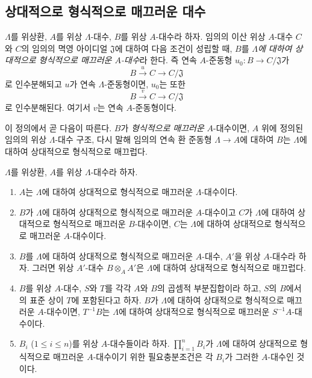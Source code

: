 \subsection{상대적으로 형식적으로 매끄러운 대수}
\label{subsection:0.19.9-ko}

\begin{definition}[19.9.1]
\label{0.19.9.1-ko}
$\Lambda$를 위상환, $A$를 위상 $\Lambda$-대수, $B$를 위상
$A$-대수라 하자. 임의의 이산 위상 $A$-대수 $C$와 $C$의 임의의
멱영 아이디얼 $\mathfrak J$에 대하여 다음 조건이 성립할 때, $B$를
\emph{$\Lambda$에 대하여 상대적으로 형식적으로 매끄러운 $A$-대수}라
한다. 즉 연속 $A$-준동형 $u_0:B\to C/\mathfrak J$가
\[
  B\xrightarrow{u}C\longrightarrow C/\mathfrak J
\]
로 인수분해되고 $u$가 연속 $\Lambda$-준동형이면, $u_0$는 또한
\[
  B\xrightarrow{v}C\longrightarrow C/\mathfrak J
\]
로 인수분해된다. 여기서 $v$는 연속 $A$-준동형이다.
\end{definition}

이 정의에서 곧 다음이 따른다. $B$가 \emph{형식적으로 매끄러운}
$A$-대수이면, $A$ 위에 정의된 임의의 위상 $\Lambda$-대수 구조,
다시 말해 임의의 연속 환 준동형 $\Lambda\to A$에 대하여 $B$는
$\Lambda$에 대하여 상대적으로 형식적으로 매끄럽다.

\begin{proposition}[19.9.2]
\label{0.19.9.2-ko}
$\Lambda$를 위상환, $A$를 위상 $\Lambda$-대수라 하자.
\begin{enumerate}
  \item[(i)] $A$는 $\Lambda$에 대하여 상대적으로 형식적으로
  매끄러운 $\Lambda$-대수이다.
  \item[(ii)] $B$가 $\Lambda$에 대하여 상대적으로 형식적으로
  매끄러운 $A$-대수이고 $C$가 $\Lambda$에 대하여 상대적으로
  형식적으로 매끄러운 $B$-대수이면, $C$는 $\Lambda$에 대하여
  상대적으로 형식적으로 매끄러운 $A$-대수이다.
  \item[(iii)] $B$를 $\Lambda$에 대하여 상대적으로 형식적으로
  매끄러운 $A$-대수, $A'$을 위상 $A$-대수라 하자. 그러면 위상
  $A'$-대수 $B\otimes_A A'$은 $\Lambda$에 대하여 상대적으로
  형식적으로 매끄럽다.
  \item[(iv)] $B$를 위상 $A$-대수, $S$와 $T$를 각각 $A$와 $B$의
  곱셈적 부분집합이라 하고, $S$의 $B$에서의 표준 상이 $T$에
  포함된다고 하자. $B$가 $\Lambda$에 대하여 상대적으로 형식적으로
  매끄러운 $A$-대수이면, $T^{-1}B$는 $\Lambda$에 대하여 상대적으로
  형식적으로 매끄러운 $S^{-1}A$-대수이다.
  \item[(v)] $B_i$ ($1\leq i\leq n$)를 위상 $A$-대수들이라 하자.
  $\prod_{i=1}^n B_i$가 $\Lambda$에 대하여 상대적으로 형식적으로
  매끄러운 $A$-대수이기 위한 필요충분조건은 각 $B_i$가 그러한
  $A$-대수인 것이다.
\end{enumerate}
\end{proposition}

